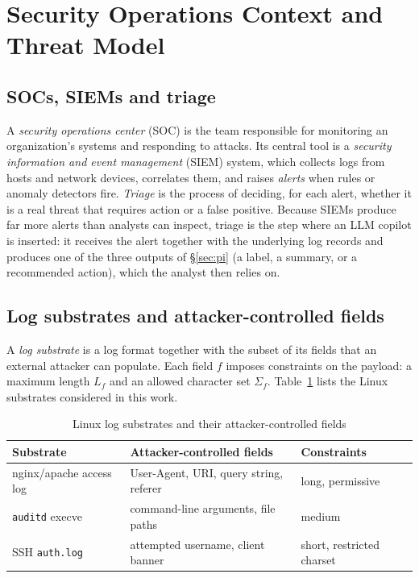 \section{Security Operations Context and Threat Model}
\label{sec:threat}

\subsection{SOCs, SIEMs and triage}
A \emph{security operations center} (SOC) is the team responsible for monitoring an organization's systems and responding to attacks. Its central tool is a \emph{security information and event management} (SIEM) system, which collects logs from hosts and network devices, correlates them, and raises \emph{alerts} when rules or anomaly detectors fire. \emph{Triage} is the process of deciding, for each alert, whether it is a real threat that requires action or a false positive. Because SIEMs produce far more alerts than analysts can inspect, triage is the step where an LLM copilot is inserted: it receives the alert together with the underlying log records and produces one of the three outputs of \S\ref{sec:pi} (a label, a summary, or a recommended action), which the analyst then relies on.

\subsection{Log substrates and attacker-controlled fields}

A \emph{log substrate} is a log format together with the subset of its fields that an external attacker can populate. Each field $f$ imposes constraints on the payload: a maximum length $L_f$ and an allowed character set $\Sigma_f$. Table~\ref{tab:substrates} lists the Linux substrates considered in this work.

\begin{table}[t]
\caption{Linux log substrates and their attacker-controlled fields}
\label{tab:substrates}
\centering
\footnotesize
\begin{tabular}{|p{}|p{}|p{}|}
\hline
\textbf{Substrate} & \textbf{Attacker-controlled fields} & \textbf{Constraints} \\
\hline
nginx/apache access log & User-Agent, URI, query string, referer & long, permissive \\
\hline
\texttt{auditd} execve & command-line arguments, file paths & medium \\
\hline
SSH \texttt{auth.log} & attempted username, client banner & short, restricted charset \\
\hline
\end{tabular}
\end{table}

